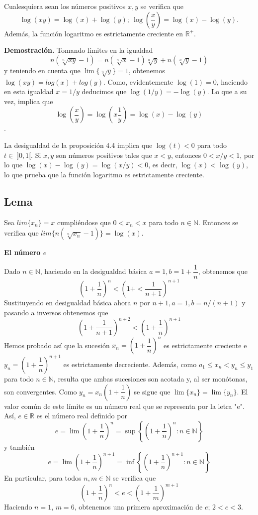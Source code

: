 \documentclass[10pt,a4paper]{article}
\begin{document}
	Cualesquiera sean los números positivos $x, y$ se verifica que 
	$$\log(xy) = \log(x) + \log(y); ~ \log\left(\dfrac{x}{y}\right) = \log(x) - \log(y).$$ Además, la función logaritmo es estrictamente creciente en $\mathbb{R} ^+$.
	
	\textbf{Demostración. }Tomando límites en la igualdad $$n (\sqrt[n]{xy} - 1) = n(\sqrt[n]{x}-1)\sqrt[n]{y} + n(\sqrt[n]{y}-1)$$ y teniendo en cuenta que $\lim\{\sqrt[n]{y}\} = 1$, obtenemos $\log(xy) = log(x) + log(y)$. Como, evidentemente $\log(1) = 0$, haciendo en esta igualdad $x = 1/y$ deducimos que $\log (1/y) = -\log(y)$. Lo que a su vez, implica que $$ \log \left(\dfrac{x}{y}\right) = \log\left(x\dfrac{1}{y}\right) = \log(x) - \log(y)$$.
	
	La desigualdad de la proposición 4.4 implica que $\log(t) < 0$ para todo $t \in \; ]0, 1[$. Si $x, y$ son números positivos tales que $x < y$, entonces $0 < x/y < 1$, por lo que $\log(x) - \log(y) = \log(x/y) < 0$, es decir, $\log(x) < \log(y)$, lo que prueba que la función logaritmo es estrictamente creciente.
	
	\subsection{Lema}
	
	Sea $lim\{x_n\} = x$ cumpliéndose que $0 < x_n < x$ para todo $n \in \mathbb{N}$. Entonces se verifica que $lim\{n(\sqrt[n]{x_n} - 1)\} = \log(x)$. \newline
	\vspace{1 cm}
	
	\textbf{\Large{El número $e$}}
	
	Dado $n \in \mathbb{N}$, haciendo en la desigualdad básica $a = 1, b = 1 + \dfrac{1}{n}$, obtenemos que $$ \left(1 + \dfrac{1}{n} \right) ^n < \left( 1 + <\dfrac{1}{n+1}\right) ^{n+1}$$ 
	Sustituyendo en desigualdad básica ahora $n$ por $n+1, a = 1, b = n/(n+1)$ y pasando a inversos obtenemos que $$ \left(1 + \dfrac{1}{n+1}\right) ^ {n+2} < \left(1 + \dfrac{1}{n}\right) ^ {n+1}$$
	Hemos probado así que la sucesión $x_n = \left(1 + \dfrac{1}{n} \right) ^n$ es estrictamente creciente e $y_n = \left(1 + \dfrac{1}{n}\right) ^ {n+1}$ es estrictamente decreciente. Además, como $a_1 \leq x_n < y_n \leq y_1$ para todo $n \in \mathbb{N}$, resulta que ambas sucesiones son acotada y, al ser monótonas, son convergentes. Como $y_n = x_n\left(1 + \dfrac{1}{n}\right)$ se sigue que $\lim\{x_n\} = \lim\{y_n\}$. El valor común de este límite es un número real que se representa por la letra "e". Así, $e \in \mathbb{R}$ es el número real definido por $$ e = \lim\left(1 + \dfrac{1}{n}\right) ^n = \sup\left\{\left(1 + \dfrac{1}{n}\right) ^n: n \in \mathbb{N}\right\}$$
	y también $$ e = \lim\left(1 + \dfrac{1}{n}\right) ^{n+1} = \inf\left\{\left(1 + \dfrac{1}{n}\right) ^{n+1}: n \in \mathbb{N}\right\}$$
	En particular, para todos $n, m \in \mathbb{N}$ se verifica que $$ \left(1 + \dfrac{1}{n}\right) ^ n < e < \left( 1 + \dfrac{1}{m}\right) ^{m+1}$$ Haciendo $n = 1$, $m = 6$, obtenemos una primera aproximación de $e$; $2 < e < 3$.
	
\end{document}
